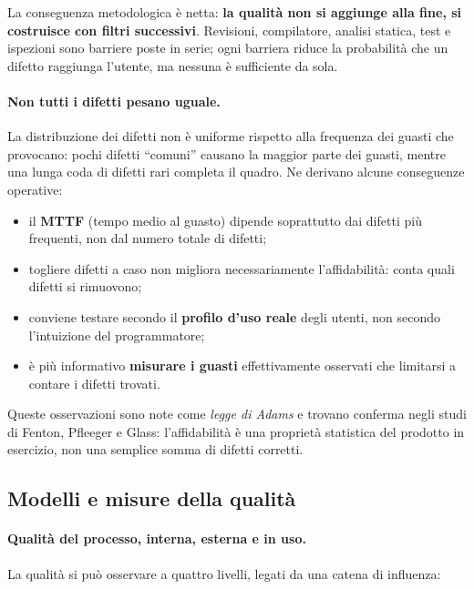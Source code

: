 \documentclass[12pt]{extarticle}
\begin{document}
\noindent La conseguenza metodologica è netta: \textbf{la qualità non si aggiunge alla fine, si costruisce con filtri successivi}. Revisioni, compilatore, analisi statica, test e ispezioni sono barriere poste in serie; ogni barriera riduce la probabilità che un difetto raggiunga l'utente, ma nessuna è sufficiente da sola.

\paragraph{Non tutti i difetti pesano uguale.}
La distribuzione dei difetti non è uniforme rispetto alla frequenza dei guasti che provocano: pochi difetti ``comuni'' causano la maggior parte dei guasti, mentre una lunga coda di difetti rari completa il quadro. Ne derivano alcune conseguenze operative:

\begin{itemize}
    \item il \textbf{MTTF} (tempo medio al guasto) dipende soprattutto dai difetti più frequenti, non dal numero totale di difetti;
    \item togliere difetti a caso non migliora necessariamente l'affidabilità: conta quali difetti si rimuovono;
    \item conviene testare secondo il \textbf{profilo d'uso reale} degli utenti, non secondo l'intuizione del programmatore;
    \item è più informativo \textbf{misurare i guasti} effettivamente osservati che limitarsi a contare i difetti trovati.
\end{itemize}

\noindent Queste osservazioni sono note come \textit{legge di Adams} e trovano conferma negli studi di Fenton, Pfleeger e Glass: l'affidabilità è una proprietà statistica del prodotto in esercizio, non una semplice somma di difetti corretti.

\subsection{Modelli e misure della qualità}

\paragraph{Qualità del processo, interna, esterna e in uso.}
La qualità si può osservare a quattro livelli, legati da una catena di influenza:
\end{document}
